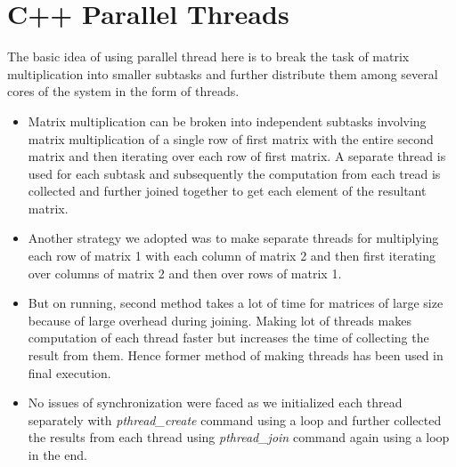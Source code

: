 \documentclass{article}
\begin{document}
\section{C++ Parallel Threads}
The basic idea of using parallel thread here is to break the task of matrix multiplication into smaller subtasks and further distribute them among several cores of the system in the form of threads.
\begin{itemize}
\item Matrix multiplication can be broken into independent subtasks involving matrix multiplication of a single row of first matrix with the entire second matrix and then iterating over each row of first matrix. A separate thread is used for each subtask and subsequently the computation from each tread is collected and further joined together to get each element of the resultant matrix. 
\item Another strategy we adopted was to make separate threads for multiplying each row of matrix 1 with each column of matrix 2 and then first iterating over columns of matrix 2 and then over rows of matrix 1.
\item But on running, second method takes a lot of time for matrices of large size because of large overhead during joining. Making lot of threads makes computation of each thread faster but increases the time of collecting the result from them. Hence former method of making threads has been used in final execution. 
\item No issues of synchronization were faced as we initialized each thread separately with \textit{pthread\_create} command using a loop and further collected the results from each thread using \textit{pthread\_join} command again using a loop in the end.  
\end{itemize}

                      
\end{document}

